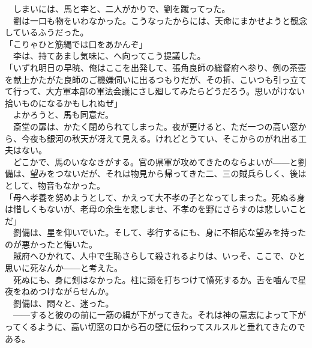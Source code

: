 \documentclass[
  paper=a5,
  fontsize=10pt,
  jafontsize=9.5pt,
  tate,                  %
  open_bracket_pos=nibu, %
]{jlreq}
\begin{document}
　しまいには、馬と李と、二人がかりで、劉を蹴ってった。\\


　劉は一口も物をいわなかった。こうなったからには、天命にまかせようと観念しているふうだった。\\


「こりゃひと筋縄では口をあかんぞ」\\


　李は、持てあまし気味に、へ向ってこう提議した。\\


「いずれ明日の早暁、俺はここを出発して、張角良師の総督府へ参り、例の茶壺を献上かたがた良師のご機嫌伺いに出るつもりだが、その折、こいつも引っ立てて行って、大方軍本部の軍法会議にさし廻してみたらどうだろう。思いがけない拾いものになるかもしれぬぜ」\\


　よかろうと、馬も同意だ。\\


　斎堂の扉は、かたく閉められてしまった。夜が更けると、ただ一つの高い窓から、今夜も銀河の秋天が冴えて見える。けれどとうてい、そこからのがれ出る工夫はない。\\


　どこかで、馬のいななきがする。官の県軍が攻めてきたのならよいが――と劉備は、望みをつないだが、それは物見から帰ってきた二、三の賊兵らしく、後はとして、物音もなかった。\\


「母へ孝養を努めようとして、かえって大不孝の子となってしまった。死ぬる身は惜しくもないが、老母の余生を悲しませ、不孝のを野にさらすのは悲しいことだ」\\


　劉備は、星を仰いでいた。そして、孝行するにも、身に不相応な望みを持ったのが悪かったと悔いた。\\


　賊府へひかれて、人中で生恥さらして殺されるよりは、いっそ、ここで、ひと思いに死なんか――と考えた。\\


　死ぬにも、身に剣はなかった。柱に頭を打ちつけて憤死するか。舌を噛んで星夜をねめつけながらせんか。\\


　劉備は、悶々と、迷った。\\


　――すると彼のの前に一筋の縄が下がってきた。それは神の意志によって下がってくるように、高い切窓の口から石の壁に伝わってスルスルと垂れてきたのである。\\
\end{document}

